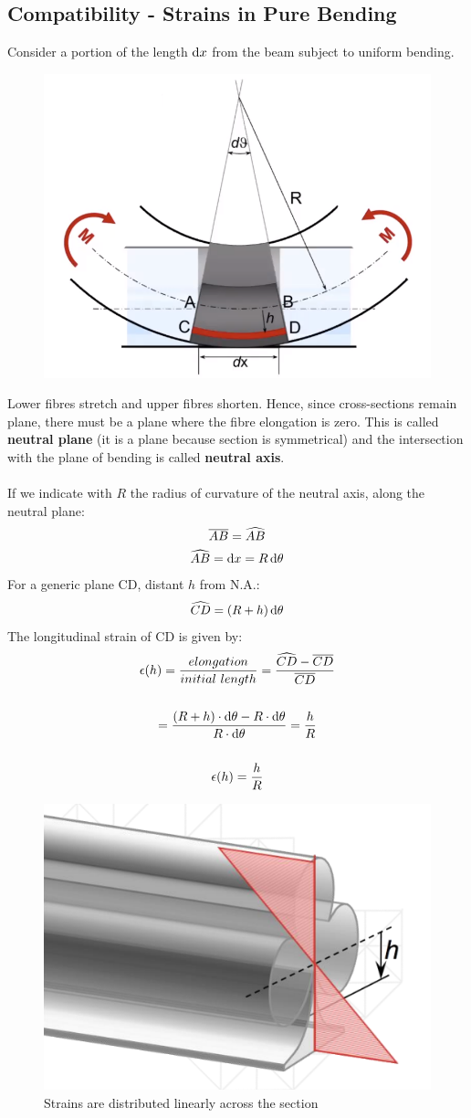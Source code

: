 \documentclass[class=report, crop=false, 12pt,a4paper]{standalone}
\begin{document}
\subsection{Compatibility - Strains in Pure Bending}
Consider a portion of the length $\dif x$ from the beam subject to uniform bending. 
\begin{figure}[H]
  \centering
  \includegraphics[width = 0.6 \textwidth]{../img/compatibility.PNG}
\end{figure}
Lower fibres stretch and upper fibres shorten. Hence, since cross-sections remain plane, there must be a plane where the fibre elongation is zero. This is called \textbf{neutral plane} (it is a plane because section is symmetrical) and the intersection with the plane of bending is called \textbf{neutral axis}. \\\\
If we indicate with $R$ the radius of curvature of the neutral axis, along the neutral plane:
\begin{gather}
  \overline{AB} = \widehat{AB}  \\
  \widehat{AB}  = \dif x = R\dif \theta
\end{gather}
For a generic plane CD, distant $h$ from N.A.:
\begin{gather}
  \widehat{CD}  = (R+h)\dif \theta
\end{gather}
The longitudinal strain of CD is given by:
\begin{gather}
  \epsilon(h) = \frac{elongation}{initial\ length} = \frac{\widehat{CD} -\overline{CD}}{\overline{CD}} \\\\
  = \frac{(R+h)\cdot \dif \theta - R\cdot \dif \theta}{R\cdot \dif \theta} = \frac{h}{R} \\\\
  \epsilon(h) = \frac{h}{R}
  \label{epsilon}
\end{gather}
\begin{figure}[H]
  \centering
  \includegraphics[width = 0.3 \textwidth]{../img/straindistribution.PNG}
  \caption{Strains are distributed linearly across the section}
\end{figure}
\end{document}
